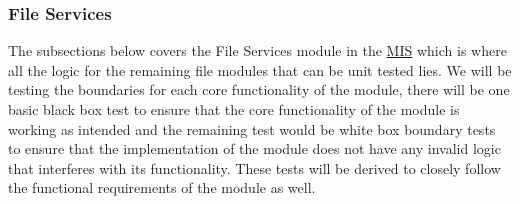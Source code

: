 \documentclass[12pt, titlepage]{article}
\begin{document}
	\subsubsection{File Services}
	
	The subsections below covers the File Services module in the \href{https://github.com/RutheniumVI/UnderTree/blob/main/docs/Design/MIS/MIS.pdf}{MIS} which is where all the logic for the remaining file modules that can be unit tested lies. We will be testing the boundaries for each core functionality of the module, there will be one basic black box test to ensure that the core functionality of the module is working as intended and the remaining test would be white box boundary tests to ensure that the implementation of the module does not have any invalid logic that interferes with its functionality. These tests will be derived to closely follow the functional requirements of the module as well.
	
\end{document}
